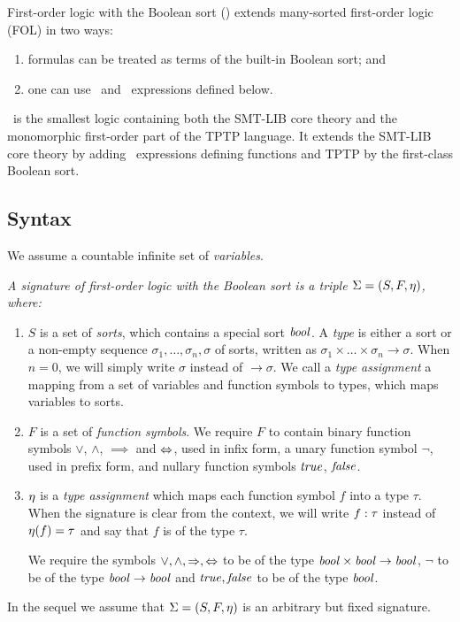 First-order logic with the Boolean sort (\folb) extends many-sorted first-order logic (FOL) in two ways:
\begin{enumerate}
\item formulas can be treated as terms of the built-in Boolean sort; and
\item one can use \ITE\ and \LETIN\ expressions defined below.
\end{enumerate}
\folb\ is the smallest logic containing both the SMT-LIB core theory and the monomorphic first-order part of the TPTP language. It extends the SMT-LIB core theory by adding \LETIN\ expressions defining functions and TPTP by the first-class Boolean sort.


\subsection{Syntax}

We assume a countable infinite set of \emph{variables}.

\begin{definition}\label{def:folb-signature}\em
  A \emph{signature} of first-order logic with the Boolean sort is a triple $\Sigma = (S, F, \eta)$, where:

  \begin{enumerate}
  \item $S$ is a set of \emph{sorts}, which contains a special sort $\mathit{bool}$. A \emph{type} is either a sort or a non-empty sequence $\sigma_1,\ldots,\sigma_n,\sigma$ of sorts, written as $\sigma_1 \times \ldots \times \sigma_n \to \sigma$. When $n = 0$, we will simply write $\sigma$ instead of $\to\sigma$. We call a \emph{type assignment} a mapping from a set of variables and function symbols to types, which maps variables to sorts.

    \item $F$ is a set of \emph{function symbols}. We require $F$ to contain binary function symbols $\vee$, $\wedge$, $\implies$ and $\Leftrightarrow$, used in infix form, a unary function symbol $\neg$, used in prefix form, and nullary function symbols $\mathit{true}$, $\mathit{false}$.

    \item $\eta$ is a \emph{type assignment} which maps each function symbol $f$ into a type $\tau$. When the signature is clear from the context, we will write ${{f}:{\tau}}$ instead of $\eta(f)=\tau$ and say that $f$ is of the type $\tau$.

    We require the symbols $\vee, \wedge, \Rightarrow, \Leftrightarrow$ to be of the type $\mathit{bool} \times \mathit{bool} \to \mathit{bool}$, $\neg$ to be of the type $\mathit{bool} \to \mathit{bool}$ and $\mathit{true},\mathit{false}$ to be of the type $\mathit{bool}$. \QED
  \end{enumerate}
\end{definition}
In the sequel we assume that $\Sigma = (S,F,\eta)$ is an arbitrary but fixed signature.

